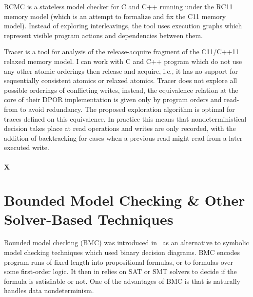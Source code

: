 
RCMC  is a stateless model checker for C and C++ running under the RC11 memory model  (which is an attempt to formalize and fix the C11 memory model).
Instead of exploring interleavings, the tool uses execution graphs which represent visible program actions and dependencies between them.

Tracer  is a tool for analysis of the release-acquire fragment of the C11/C++11 relaxed memory model.
I can work with C and C++ program which do not use any other atomic orderings then release and acquire, i.e., it has no support for sequentially consistent atomics or relaxed atomics.
Tracer does not explore all possible orderings of conflicting writes, instead, the equivalence relation at the core of their DPOR implementation is given only by program orders and read-from to avoid redundancy.
The proposed exploration algorithm is optimal for traces defined on this equivalence.
In practice this means that nondeterministical decision takes place at read operations and writes are only recorded, with the addition of backtracking for cases when a previous read might read from a later executed write.

\paragraph{X}




\section{Bounded Model Checking \& Other Solver-Based Techniques}

Bounded model checking (BMC) was introduced in~\cite{Biere1999} as an alternative to
symbolic model checking techniques which used binary decision diagrams.
BMC encodes program runs of fixed length into propositional formulas, or to
formulas over some first-order logic.
It then in relies on SAT or SMT solvers to decide if the formula is satisfiable
or not. 
One of the advantages of BMC is that is naturally handles data nondeterminism.


